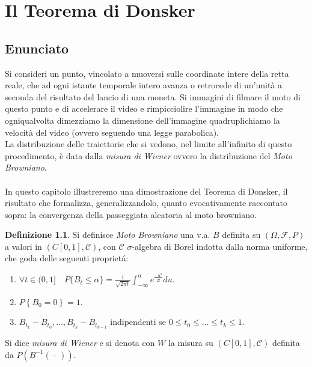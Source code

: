 \documentclass[11pt, twoside]{report}
\theoremstyle{definition}
\newtheorem{definizione}{Definizione}[chapter]
\theoremstyle{plain}
\theoremstyle{remark}
\numberwithin{equation}{chapter}
\begin{document}
\chapter{Il Teorema di Donsker}
\section{Enunciato}
Si consideri un punto, vincolato a muoversi sulle coordinate intere della retta reale, che ad ogni istante temporale intero avanza o retrocede di un'unità a seconda del risultato del lancio di una moneta. Si immagini di filmare il moto di questo punto e di accelerare il video e rimpicciolire l'immagine in modo che ogniqualvolta dimezziamo la dimensione dell'immagine quadruplichiamo la velocità del video (ovvero seguendo una legge parabolica).\\
La distribuzione delle traiettorie che si vedono, nel limite all'infinito di questo procedimento, è data dalla \textit{misura di Wiener} ovvero la distribuzione del \textit{Moto Browniano}.\\
\\
In questo capitolo illustreremo una dimostrazione del Teorema di Donsker, il risultato che formalizza, generalizzandolo, quanto evocativamente raccontato sopra: la convergenza della passeggiata aleatoria al moto browniano. 

\begin{definizione}Si definisce \textit{Moto Browniano} una v.a. $B$ definita su $(\Omega , \mathscr F, P)$ a valori in $(C [0,1], \mathscr C )$, con $\mathscr C$ $\sigma$-algebra di Borel indotta dalla norma uniforme, che goda delle seguenti propriet\'{a}:

\begin{enumerate}
\item $ \forall t \in (0,1] \quad P\{ B_t \leq \alpha\}= \frac{1}{ \sqrt{2 \pi t}}\int_{-\infty}^{\alpha}e^{\frac{-u^2}{2t}}du $.

\item $ P \left\{ B_0 = 0 \right\}=1 $.

\item $ B_{t_1}-B_{t_0}, ... , B_{t_k} - B_{t_{k-1}}$ indipendenti se $ 0 \leq t_0 \leq ... \leq t_k \leq 1$.

\end{enumerate}
Si dice \textit{misura di Wiener} e si denota con $W$ la misura su $(C[0,1], \mathscr C)$ definita da $P(B^{-1}(\,\cdot\,))$.
\end{definizione}
\end{document}
